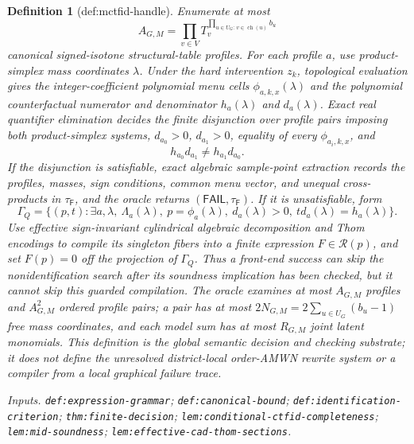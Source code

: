 \documentclass{article}
\newtheorem{definition}{Definition}
\begin{document}
\begin{definition}[def:mctfid-handle]
Enumerate at most
\[
 A_{G,M}=\prod_{v\in V}T_v^{\prod_{u\in U_G:\,v\in\operatorname{ch}(u)}b_u}
\]
canonical signed-isotone structural-table profiles.  For each profile \(a\), use product-simplex mass coordinates \(\lambda\).  Under the hard intervention \(z_k\), topological evaluation gives the integer-coefficient polynomial menu cells \(\phi_{a,k,x}(\lambda)\) and the polynomial counterfactual numerator and denominator \(h_a(\lambda)\) and \(d_a(\lambda)\).  Exact real quantifier elimination decides the finite disjunction over profile pairs imposing both product-simplex systems, \(d_{a_0}>0\), \(d_{a_1}>0\), equality of every \(\phi_{a_i,k,x}\), and
\[
 h_{a_0}d_{a_1}\ne h_{a_1}d_{a_0}.
\]
If the disjunction is satisfiable, exact algebraic sample-point extraction records the profiles, masses, sign conditions, common menu vector, and unequal cross-products in \(\tau_{\mathsf F}\), and the oracle returns \((\mathsf{FAIL},\tau_{\mathsf F})\).  If it is unsatisfiable, form
\[
 \Gamma_Q=\{(p,t):\exists a,\lambda,\ \Lambda_a(\lambda),\ p=\phi_a(\lambda),\ d_a(\lambda)>0,\ t d_a(\lambda)=h_a(\lambda)\}.
\]
Use effective sign-invariant cylindrical algebraic decomposition and Thom encodings to compile its singleton fibers into a finite expression \(F\in\mathcal R(p)\), and set \(F(p)=0\) off the projection of \(\Gamma_Q\).  Thus a front-end success can skip the nonidentification search after its soundness implication has been checked, but it cannot skip this guarded compilation.  The oracle examines at most \(A_{G,M}\) profiles and \(A_{G,M}^2\) ordered profile pairs; a pair has at most \(2N_{G,M}=2\sum_{u\in U_G}(b_u-1)\) free mass coordinates, and each model sum has at most \(R_{G,M}\) joint latent monomials.  This definition is the global semantic decision and checking substrate; it does not define the unresolved district-local order-AMWN rewrite system or a compiler from a local graphical failure trace.
\par\smallskip\noindent\emph{Inputs.} \texttt{def:\allowbreak{}expression-\allowbreak{}grammar}; \texttt{def:\allowbreak{}canonical-\allowbreak{}bound}; \texttt{def:\allowbreak{}identification-\allowbreak{}criterion}; \texttt{thm:\allowbreak{}finite-\allowbreak{}decision}; \texttt{lem:\allowbreak{}conditional-\allowbreak{}ctfid-\allowbreak{}completeness}; \texttt{lem:\allowbreak{}mid-\allowbreak{}soundness}; \texttt{lem:\allowbreak{}effective-\allowbreak{}cad-\allowbreak{}thom-\allowbreak{}sections}.
\end{definition}
\end{document}
